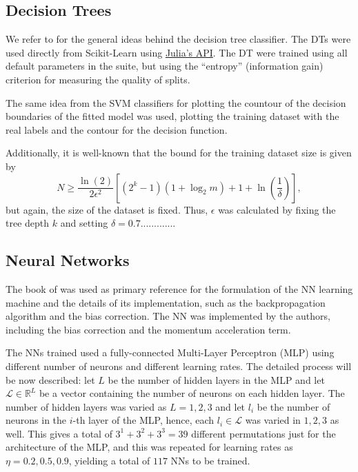 \documentclass[conference]{IEEEtran}
\theoremstyle{definition}
\theoremstyle{remark}
\theoremstyle{remark}
\begin{document}
\subsection{Decision Trees}
We refer to \textcite{bramer2007} for the general ideas behind the decision tree
classifier. The DTs were used directly from Scikit-Learn
\parencite{scikit-learn, sklearn_api} using
\href{https://bit.ly/3lDHADX}{Julia's API}. The DT were trained using all
default parameters in the suite, but using the ``entropy'' (information gain)
criterion for measuring the quality of splits.

The same idea from the SVM classifiers for plotting the countour of the decision
boundaries of the fitted model was used, plotting the training dataset with the
real labels and the contour for the decision function.

Additionally, it is well-known that the bound for the training dataset size is
given by
\begin{equation}
  N\geq \dfrac{\ln(2)}{2\epsilon^2}\left[(2^k-1)(1+\log_2 m) + 1 + \ln\left(
  \dfrac{1}{\delta}\right)\right],
\end{equation}
but again, the size of the dataset is fixed. Thus, $\epsilon$ was calculated by
fixing the tree depth $k$ and setting $\delta=0.7$.............

\subsection{Neural Networks}
The book of \textcite{aggarwal2018} was used as primary reference for the
formulation of the NN learning machine and the details of its implementation,
such as the backpropagation algorithm and the bias correction.
The NN was implemented by the authors, including the bias correction and the
momentum acceleration term.

The NNs trained used a fully-connected Multi-Layer Perceptron (MLP) using
different number of neurons and different learning rates. The detailed process
will be now described: let $L$ be the number of hidden layers in the MLP and let
$\mathcal{L}\in\mathbb{R}^{L}$ be a vector containing the number of neurons on
each hidden layer. The number of hidden layers was varied as $L=1,2,3$ and let
$l_i$ be the number of neurons in the $i$-th layer of the MLP, hence, each
$l_i\in\mathcal{L}$ was varied in $1,2,3$ as well. This gives a total of
$3^1+3^2+3^3=39$ different permutations just for the architecture of the MLP,
and this was repeated for learning rates as $\eta=0.2,0.5,0.9$, yielding a total
of $117$ NNs to be trained.
\end{document}

